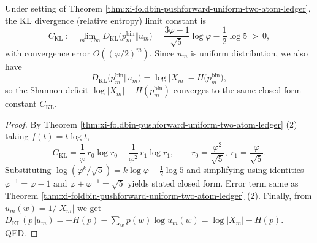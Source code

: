 \begin{corollary}\label{cor:xi-foldbin-shannon-deficit-constant-closed-form}
Under setting of Theorem \ref{thm:xi-foldbin-pushforward-uniform-two-atom-ledger}, the KL divergence (relative entropy) limit constant is
\[
C_{\mathrm{KL}}
:=\lim_{m\to\infty}D_{\mathrm{KL}}\bigl(p^{\mathrm{bin}}_m\Vert u_m\bigr)
=\frac{3\varphi-1}{\sqrt5}\log\varphi-\frac12\log 5\ >\ 0,
\]
with convergence error \(O((\varphi/2)^m)\).
Since \(u_m\) is uniform distribution, we also have
\[
D_{\mathrm{KL}}\bigl(p^{\mathrm{bin}}_m\Vert u_m\bigr)=\log|X_m|-H\bigl(p^{\mathrm{bin}}_m\bigr),
\]
so the Shannon deficit \(\log|X_m|-H(p^{\mathrm{bin}}_m)\) converges to the same closed-form constant \(C_{\mathrm{KL}}\).
\end{corollary}
\begin{proof}
By Theorem \ref{thm:xi-foldbin-pushforward-uniform-two-atom-ledger} (2) taking \(f(t)=t\log t\),
\[
C_{\mathrm{KL}}
=\frac{1}{\varphi}\,r_0\log r_0+\frac{1}{\varphi^2}\,r_1\log r_1,
\qquad
r_0=\frac{\varphi^2}{\sqrt5},\ r_1=\frac{\varphi}{\sqrt5}.
\]
Substituting \(\log(\varphi^k/\sqrt5)=k\log\varphi-\tfrac12\log 5\) and simplifying using identities
\(\varphi^{-1}=\varphi-1\) and \(\varphi+\varphi^{-1}=\sqrt5\) yields stated closed form.
Error term same as Theorem \ref{thm:xi-foldbin-pushforward-uniform-two-atom-ledger} (2).
Finally, from \(u_m(w)=1/|X_m|\) we get
\(
D_{\mathrm{KL}}(p\Vert u_m)=-H(p)-\sum_w p(w)\log u_m(w)=\log|X_m|-H(p)
\). QED.
\end{proof}


